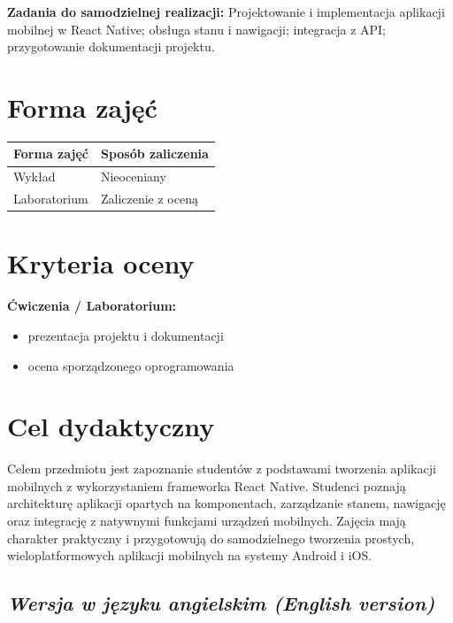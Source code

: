 \documentclass[12pt, a4paper]{article}
\newcommand{\thdrule}{\noalign{\global\setlength{\extrarowheight}{0pt}}}
\newcommand{\thdend}{\noalign{\global\setlength{\extrarowheight}{3pt}}}
\begin{document}
\vspace{4pt}
\noindent\textbf{Zadania do samodzielnej realizacji:} Projektowanie i implementacja aplikacji mobilnej w React Native; obsługa stanu i nawigacji; integracja z API; przygotowanie dokumentacji projektu.

\section{Forma zajęć}

\begin{center}
{\scriptsize
\begin{tabular}{m{5cm}m{8cm}}
\thdrule\toprule
\rowcolor{pjatkRed} {\color{white}\textbf{Forma zajęć}} & {\color{white}\textbf{Sposób zaliczenia}} \\
\midrule\thdend
  \rowcolor{tableRowLight} Wykład & Nieoceniany \\
  \rowcolor{tableRowAlt} Laboratorium & Zaliczenie z oceną \\
\bottomrule
\end{tabular}}
\end{center}

\section{Kryteria oceny}

\textbf{Ćwiczenia / Laboratorium:}
\begin{itemize}
  \item prezentacja projektu i dokumentacji
  \item ocena sporządzonego oprogramowania
\end{itemize}


\section{Cel dydaktyczny}

Celem przedmiotu jest zapoznanie studentów z podstawami tworzenia aplikacji mobilnych z wykorzystaniem frameworka React Native. Studenci poznają architekturę aplikacji opartych na komponentach, zarządzanie stanem, nawigację oraz integrację z natywnymi funkcjami urządzeń mobilnych. Zajęcia mają charakter praktyczny i przygotowują do samodzielnego tworzenia prostych, wieloplatformowych aplikacji mobilnych na systemy Android i iOS.

\subsection*{\textit{Wersja w języku angielskim (English version)}}
\end{document}
